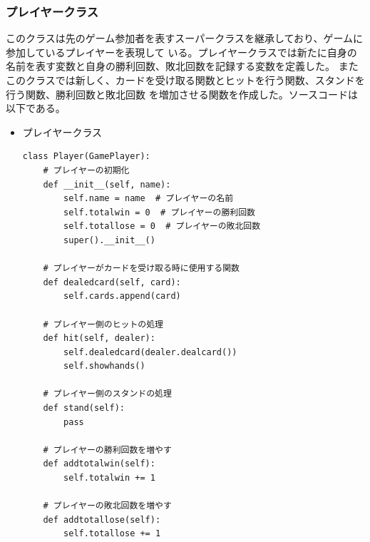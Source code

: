\subsubsection{プレイヤークラス}
このクラスは先のゲーム参加者を表すスーパークラスを継承しており、ゲームに参加しているプレイヤーを表現して
いる。プレイヤークラスでは新たに自身の名前を表す変数と自身の勝利回数、敗北回数を記録する変数を定義した。
またこのクラスでは新しく、カードを受け取る関数とヒットを行う関数、スタンドを行う関数、勝利回数と敗北回数
を増加させる関数を作成した。ソースコードは以下である。
\begin{itemize}
\item プレイヤークラス
\begin{lstlisting}
class Player(GamePlayer):
    # プレイヤーの初期化
    def __init__(self, name):
        self.name = name  # プレイヤーの名前
        self.totalwin = 0  # プレイヤーの勝利回数
        self.totallose = 0  # プレイヤーの敗北回数
        super().__init__()

    # プレイヤーがカードを受け取る時に使用する関数
    def dealedcard(self, card):
        self.cards.append(card)

    # プレイヤー側のヒットの処理
    def hit(self, dealer):
        self.dealedcard(dealer.dealcard())
        self.showhands()

    # プレイヤー側のスタンドの処理
    def stand(self):
        pass

    # プレイヤーの勝利回数を増やす
    def addtotalwin(self):
        self.totalwin += 1

    # プレイヤーの敗北回数を増やす
    def addtotallose(self):
        self.totallose += 1

\end{lstlisting}
\end{itemize}

